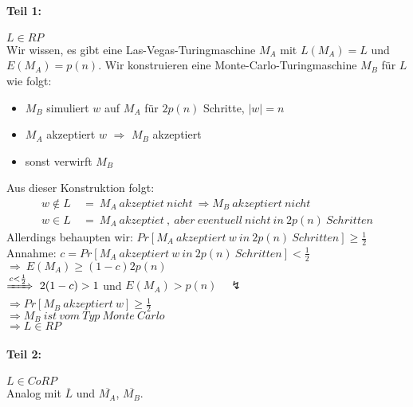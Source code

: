 \paragraph{Teil 1:}
$L \in RP$\\
Wir wissen, es gibt eine Las-Vegas-Turingmaschine $M_A$ mit $L(M_A) = L$ und $E(M_A) = p(n)$.
Wir konstruieren eine Monte-Carlo-Turingmaschine $M_B$ für $L$ wie folgt:
\begin{itemize}
	\item $M_B$ simuliert $w$ auf $M_A$ für $2p(n)$ Schritte, $|w| = n$
	\item $M_A$ akzeptiert $w$ $\Rightarrow$ $M_B$ akzeptiert
	\item sonst verwirft $M_B$
\end{itemize}
Aus dieser Konstruktion folgt:
\begin{align*}
	w \notin L\ &=\ M_A\ akzeptiet\ nicht\ \Rightarrow M_B\ akzeptiert\ nicht \\
	w \in L\ &=\ M_A\ akzeptiet\ ,\ aber\ eventuell\ nicht\ in\ 2p(n)\ Schritten
\end{align*}
Allerdings behaupten wir:
$Pr[M_A\ akzeptiert\ w\ in\ 2p(n)\ Schritten] \geq \frac{1}{2}$ \\
Annahme:
$c = Pr[M_A\ akzeptiert\ w\ in\ 2p(n)\ Schritten] < \frac{1}{2}$ \\
$\Rightarrow\ E(M_A) \geq (1-c)2p(n)$\\
$\xRightarrow{c < \frac{1}{2}}\ 2(1-c) > 1$ und $E(M_A) > p(n) \quad \lightning$\\
$\Rightarrow Pr[M_B\ akzeptiert\ w] \geq \frac{1}{2}$\\
$\Rightarrow M_B\ ist\ vom\ Typ\ Monte\ Carlo$\\
$\Rightarrow L \in RP$

\paragraph{Teil 2:}
$L \in CoRP$\\
Analog mit $\overline{L}$ und $\overline{M_A}$, $\overline{M_B}$.



